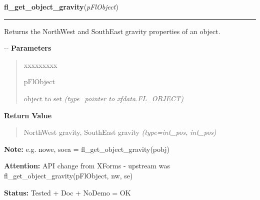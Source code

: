     \vspace{0.5ex}

\hspace{.8\funcindent}\begin{boxedminipage}{\funcwidth}

    \raggedright \textbf{fl\_get\_object\_gravity}(\textit{pFlObject})

    \vspace{-1.5ex}

    \rule{\textwidth}{0.5\fboxrule}
\setlength{\parskip}{2ex}

Returns the NorthWest and SouthEast gravity properties of an object.

-{}-
\setlength{\parskip}{1ex}
      \textbf{Parameters}
      \vspace{-1ex}

      \begin{quote}
        \begin{Ventry}{xxxxxxxxx}

          \item[pFlObject]


object to set
            {\it (type=pointer to xfdata.FL\_OBJECT)}

        \end{Ventry}

      \end{quote}

      \textbf{Return Value}
    \vspace{-1ex}

      \begin{quote}

NorthWest gravity, SouthEast gravity
      {\it (type=int\_pos, int\_pos)}

      \end{quote}

\textbf{Note:} 
e.g. nowe, soea = fl\_get\_object\_gravity(pobj)


\textbf{Attention:} 
API change from XForms - upstream was
fl\_get\_object\_gravity(pFlObject, nw, se)


\textbf{Status:} 
Tested + Doc + NoDemo = OK


    \end{boxedminipage}

    \label{xformslib:flbasic:fl_set_object_lsize}

    \vspace{0.5ex}

